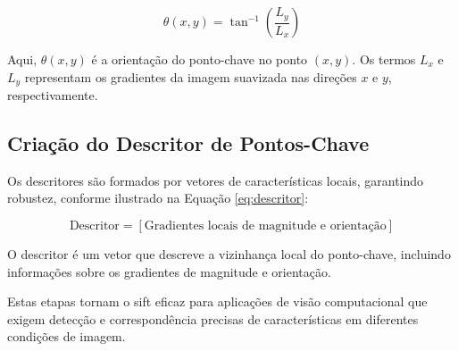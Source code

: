 \begin{equation}
\theta(x, y) = \tan^{-1}\left(\frac{L_y}{L_x}\right)
    \label{eq:pc2}
\end{equation}

Aqui, \(\theta(x, y)\) é a orientação do ponto-chave no ponto \((x, y)\). Os termos \(L_x\) e \(L_y\) representam os gradientes da imagem suavizada nas direções \(x\) e \(y\), respectivamente.

\subsection*{Criação do Descritor de Pontos-Chave}
Os descritores são formados por vetores de características locais, garantindo robustez, conforme ilustrado na Equação \ref{eq:descritor}:

\begin{equation}
    \text{Descritor} = \left[\text{Gradientes locais de magnitude e orientação}\right]
    \label{eq:descritor}
\end{equation}

O descritor é um vetor que descreve a vizinhança local do ponto-chave, incluindo informações sobre os gradientes de magnitude e orientação.

Estas etapas tornam o \gls{sift} eficaz para aplicações de visão computacional que exigem detecção e correspondência precisas de características em diferentes condições de imagem.




